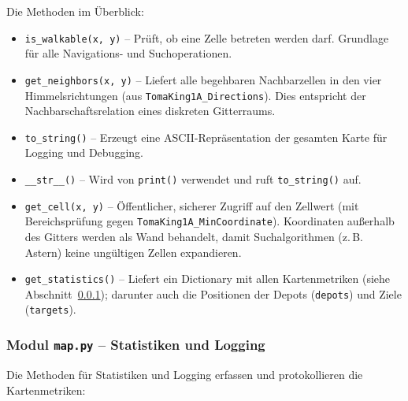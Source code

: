 

Die Methoden im Überblick:
\begin{itemize}
    \item \texttt{is\_walkable(x, y)} – Prüft, ob eine Zelle betreten werden darf. Grundlage für alle Navigations- und Suchoperationen.
    \item \texttt{get\_neighbors(x, y)} – Liefert alle begehbaren Nachbarzellen in den vier Himmelsrichtungen (aus \texttt{TomaKing1A\_Directions}). Dies entspricht der Nachbarschaftsrelation eines diskreten Gitterraums.
    \item \texttt{to\_string()} – Erzeugt eine \acs{ASCII}-Repräsentation der gesamten Karte für Logging und Debugging.
    \item \texttt{\_\_str\_\_()} – Wird von \texttt{print()} verwendet und ruft \texttt{to\_string()} auf.
    \item \texttt{get\_cell(x, y)} – Öffentlicher, sicherer Zugriff auf den Zellwert (mit Bereichsprüfung gegen \texttt{TomaKing1A\_MinCoordinate}). Koordinaten außerhalb des Gitters werden als Wand behandelt, damit Suchalgorithmen (z.\,B. \acs{Astern}) keine ungültigen Zellen expandieren.
    \item \texttt{get\_statistics()} – Liefert ein Dictionary mit allen Kartenmetriken (siehe Abschnitt~\ref{sssec:map_stats}); darunter auch die Positionen der Depots (\texttt{depots}) und Ziele (\texttt{targets}).
\end{itemize}


\subsubsection{Modul \texttt{map.py} – Statistiken und Logging}
\label{sssec:map_stats}

Die Methoden für Statistiken und Logging erfassen und protokollieren die Kartenmetriken:



